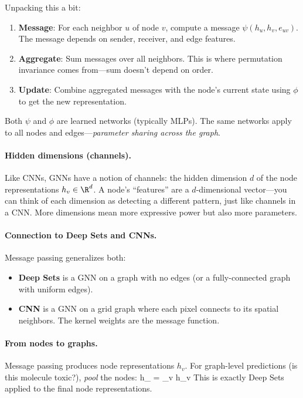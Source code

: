 \documentclass[11pt]{article}
\begin{document}
Unpacking this a bit:
\begin{enumerate}
    \item \textbf{Message}: For each neighbor $u$ of node $v$, compute a message $\psi(h_u, h_v, e_{uv})$. The message depends on sender, receiver, and edge features.
    \item \textbf{Aggregate}: Sum messages over all neighbors. This is where permutation invariance comes from---sum doesn't depend on order.
    \item \textbf{Update}: Combine aggregated messages with the node's current state using $\phi$ to get the new representation.
\end{enumerate}

Both $\psi$ and $\phi$ are learned networks (typically MLPs). The same networks apply to all nodes and edges---\emph{parameter sharing across the graph}.

\paragraph{Hidden dimensions (channels).} Like CNNs, GNNs have a notion of channels: the hidden dimension $d$ of the node representations $h_v \in \R^d$. A node's ``features'' are a $d$-dimensional vector---you can think of each dimension as detecting a different pattern, just like channels in a CNN. More dimensions mean more expressive power but also more parameters.

\paragraph{Connection to Deep Sets and CNNs.} Message passing generalizes both:
\begin{itemize}
    \item \textbf{Deep Sets} is a GNN on a graph with no edges (or a fully-connected graph with uniform edges).
    \item \textbf{CNN} is a GNN on a grid graph where each pixel connects to its spatial neighbors. The kernel weights are the message function.
\end{itemize}

\paragraph{From nodes to graphs.} Message passing produces node representations $h_v$. For graph-level predictions (is this molecule toxic?), \emph{pool} the nodes:
\beq
h_{} = \sum_{v \in {}} h_v
\eeq
This is exactly Deep Sets applied to the final node representations.
\end{document}
